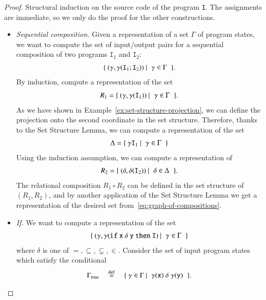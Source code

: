 \begin{proof}
 Structural induction on the source code of the program {\tt I}. The assignments are immediate, so we only do the proof for the other constructions.

\begin{itemize}
 \item \emph{Sequential composition.} Given a representation of a set $\Gamma$ of program states, we want to compute the set of input/output pairs for a sequential composition of two programs $\mathtt{I}_1$ and $\mathtt{I}_2$:
 \begin{align}\label{eq:graph-of-compositions}
 \setbuild{(\gamma, \gamma (\mathtt{I}_1\mathtt{;I}_2))}{$\gamma \in \Gamma$}.
 \end{align}
 By induction, compute a representation of the set
 \begin{align*}
 R_1 = \setbuild{(\gamma, \gamma (\mathtt{I}_1))}{$\gamma \in \Gamma$}.
 \end{align*}
 As we have shown in Example~\ref{ex:set-structure-projection}, we can define the projection onto the second coordinate in the set structure. Therefore, thanks to the Set Structure Lemma, we can compute a representation of the set
	\begin{align*}
		\Delta = \setbuild{ \gamma \mathtt{I}_1}{$\gamma \in \Gamma$}
		\end{align*}
Using  the  induction assumption, we can compute a representation of 
 \begin{align*}
 R_2 = \setbuild{(\delta, \delta (\mathtt{I}_2))} {$\delta \in \Delta$}.
 \end{align*}
 The relational composition  $R_1 \circ R_2$ can be defined in the set structure of $(R_1,R_2)$, and by another application of the Set Structure Lemma we get a representation of the desired set from~\eqref{eq:graph-of-compositions}.
\item \emph{If.} We want to compute a representation of the set 
\begin{align}\label{eq:if-then-graph}
 \setbuild{
(\gamma, \gamma (\mathtt{if\ x}\ \delta\ \mathtt{ y\ then\ I})}{$ \gamma \in \Gamma$}
\end{align}
	 where $\delta$ is one of $=,\subseteq,\subsetneq, \in$. Consider the set of input program states which satisfy the conditional
	 \begin{align*}
		 \Gamma_{\text{true}} \quad \eqdef \quad \setbuild{ \gamma \in \Gamma}{$\gamma(\mathtt{x})\ \delta\ \gamma(\mathtt y)$}.
 \end{align*}

\end{itemize}
\end{proof}
